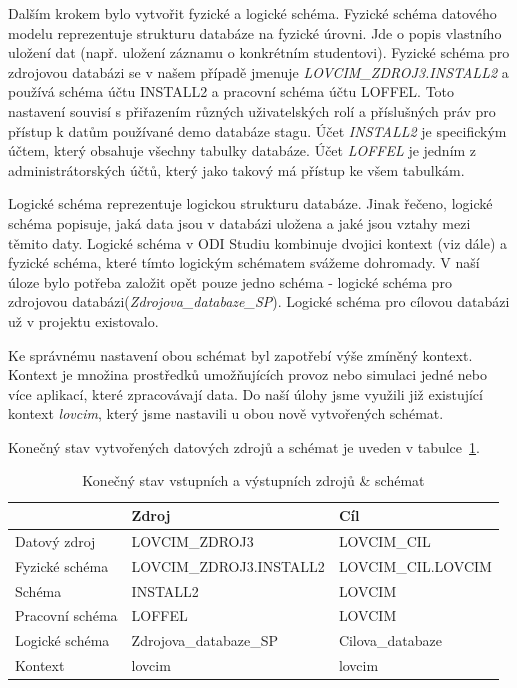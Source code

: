 Dalším krokem bylo vytvořit fyzické a logické schéma.
Fyzické schéma datového modelu reprezentuje strukturu databáze na fyzické úrovni.
Jde o popis vlastního uložení dat (např. uložení záznamu o konkrétním studentovi).
Fyzické schéma pro zdrojovou databázi se v našem případě jmenuje \textit{LOVCIM\_ZDROJ3.INSTALL2} a používá schéma účtu INSTALL2 a pracovní schéma účtu LOFFEL.
Toto nastavení souvisí s přiřazením různých uživatelských rolí a příslušných práv pro přístup k datům používané demo databáze stagu.
Účet \textit{INSTALL2} je specifickým účtem, který obsahuje všechny tabulky databáze.
Účet \textit{LOFFEL} je jedním z administrátorských účtů, který jako takový má přístup ke všem tabulkám. 

Logické schéma reprezentuje logickou strukturu databáze.
Jinak řečeno, logické schéma popisuje, jaká data jsou v databázi uložena a jaké jsou vztahy mezi těmito daty.
Logické schéma v ODI Studiu kombinuje dvojici kontext (viz dále) a fyzické schéma, které tímto logickým schématem svážeme dohromady.
V naší úloze bylo potřeba založit opět pouze jedno schéma - logické schéma pro zdrojovou databázi(\textit{Zdrojova\_databaze\_SP}).
Logické schéma pro cílovou databázi už v projektu existovalo.

Ke správnému nastavení obou schémat byl zapotřebí výše zmíněný kontext.
Kontext je množina prostředků umožňujících provoz nebo simulaci jedné nebo více aplikací, které zpracovávají data.
Do naší úlohy jsme využili již existující kontext \textit{lovcim}, který jsme nastavili u obou nově vytvořených schémat. 

Konečný stav vytvořených datových zdrojů a schémat je uveden v tabulce~\ref{table:table3}.

\begin{table}[htb]
    \centering

    \begin{tabular}{lll}
        \toprule

                        & Zdroj                     & Cíl                   \\ \midrule
        Datový zdroj    & LOVCIM\_ZDROJ3            & LOVCIM\_CIL           \\
        Fyzické schéma  & LOVCIM\_ZDROJ3.INSTALL2   & LOVCIM\_CIL.LOVCIM    \\
        Schéma          & INSTALL2                  & LOVCIM                \\
        Pracovní schéma & LOFFEL                    & LOVCIM                \\
        Logické schéma  & Zdrojova\_databaze\_SP    & Cilova\_databaze      \\
        Kontext         & lovcim                    & lovcim                \\
          
        \bottomrule
    \end{tabular}

    \caption{Konečný stav vstupních a výstupních zdrojů \& schémat}
    \label{table:table3}
\end{table}
\FloatBarrier

